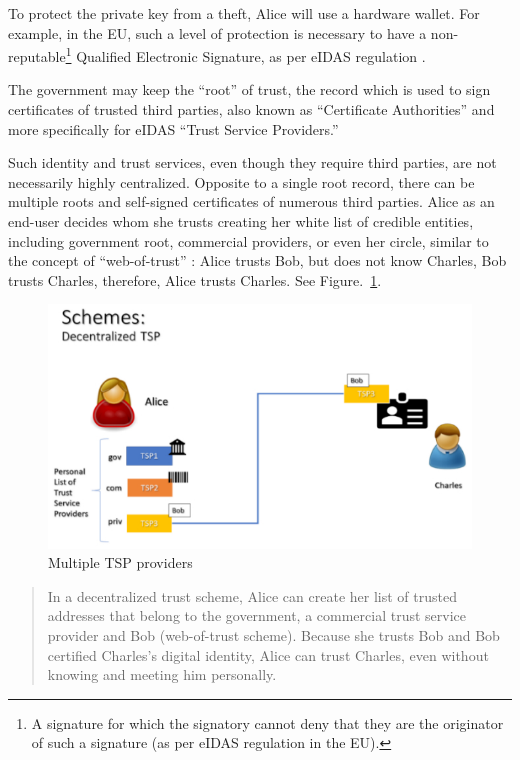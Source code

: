 \begin{multicols}{2}
To protect the private key from a theft, Alice will use a hardware wallet. For example, in the EU, such a level of protection is necessary to have a non-reputable\footnote{A signature for which the signatory cannot deny that they are the originator of such a signature (as per eIDAS regulation in the EU).} Qualified Electronic Signature, as per eIDAS regulation \cite{art1-key43}.

The government may keep the “root” of trust, the record which is used to sign certificates of trusted third parties, also known as “Certificate Authorities” and more specifically for eIDAS “Trust Service Providers.”

Such identity and trust services, even though they require third parties, are not necessarily highly centralized. Opposite to a single root record, there can be multiple roots and self-signed certificates of numerous third parties. Alice as an end-user decides whom she trusts creating her white list of credible entities, including government root, commercial providers, or even her circle, similar to the concept of “web-of-trust” \cite{art1-key44}: Alice trusts Bob, but does not know Charles, Bob trusts Charles, therefore, Alice trusts Charles. See Figure.~\ref{chap1-fig09}.
\begin{figure}[H]
\centering
\includegraphics[scale=1.6]{src/Figures/chap1/chap1-fig09.jpg}
\caption{Multiple TSP providers}\label{chap1-fig09}
\end{figure}

\begin{quote}
In a decentralized trust scheme, Alice can create her list of trusted addresses that belong to the government, a commercial trust service provider and Bob (web-of-trust scheme). Because she trusts Bob and Bob certified Charles’s digital identity, Alice can trust Charles, even without knowing and meeting him personally.
\end{quote}


\end{multicols}

